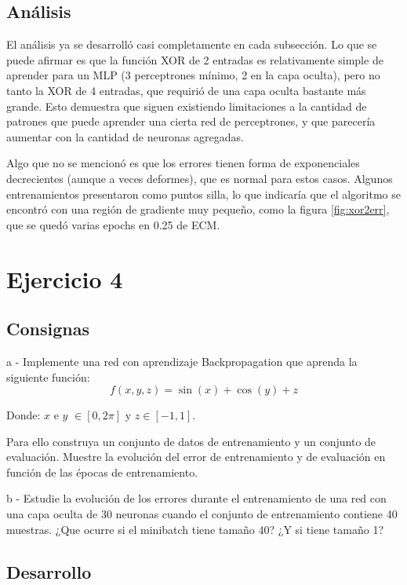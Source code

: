 \documentclass[11pt]{article} %
\begin{document}
\subsection{Análisis}

El análisis ya se desarrolló casi completamente en cada subsección. Lo que se puede afirmar es que la función XOR de 2 entradas es relativamente simple de aprender para un MLP (3 perceptrones mínimo, 2 en la capa oculta), pero no tanto la XOR de 4 entradas, que requirió de una capa oculta bastante más grande. Esto demuestra que siguen existiendo limitaciones a la cantidad de patrones que puede aprender una cierta red de perceptrones, y que parecería aumentar con la cantidad de neuronas agregadas.

Algo que no se mencionó es que los errores tienen forma de exponenciales decrecientes (aunque a veces deformes), que es normal para estos casos. Algunos entrenamientos presentaron como puntos silla, lo que indicaría que el algoritmo se encontró con una región de gradiente muy pequeño, como la figura \ref{fig:xor2err}, que se quedó varias epochs en 0.25 de ECM.



\section{Ejercicio 4}

\subsection{Consignas}

a - Implemente una red con aprendizaje Backpropagation que aprenda la siguiente función:
$$
f (x , y , z)= \sin(x)+\cos(y)+z
$$

Donde: $x$ e $y$ $\in [0,2 \pi]$ y $z \in [-1,1]$.

Para ello construya un conjunto de datos de entrenamiento y un conjunto de evaluación. Muestre la evolución del error de entrenamiento y de evaluación en función de las épocas de entrenamiento.

b - Estudie la evolución de los errores durante el entrenamiento de una red con una capa oculta de 30 neuronas cuando el conjunto de entrenamiento contiene 40 muestras. ¿Que ocurre si el minibatch tiene tamaño 40? ¿Y si tiene tamaño 1?

\subsection{Desarrollo}
\end{document}
